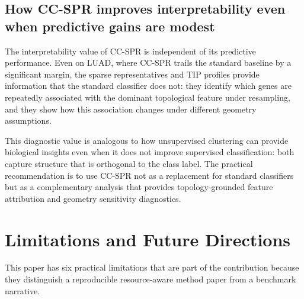 \documentclass[11pt]{article}
\begin{document}
\subsection{How CC-SPR improves interpretability even when predictive gains are modest}

The interpretability value of CC-SPR is independent of its predictive performance.
Even on LUAD, where CC-SPR trails the standard baseline by a significant margin, the sparse representatives and TIP profiles provide information that the standard classifier does not: they identify which genes are repeatedly associated with the dominant topological feature under resampling, and they show how this association changes under different geometry assumptions.

This diagnostic value is analogous to how unsupervised clustering can provide biological insights even when it does not improve supervised classification: both capture structure that is orthogonal to the class label.
The practical recommendation is to use CC-SPR not as a replacement for standard classifiers but as a complementary analysis that provides topology-grounded feature attribution and geometry sensitivity diagnostics.

\section{Limitations and Future Directions}
\label{sec:limitations}

This paper has six practical limitations that are part of the contribution because they distinguish a reproducible resource-aware method paper from a benchmark narrative.
\end{document}
